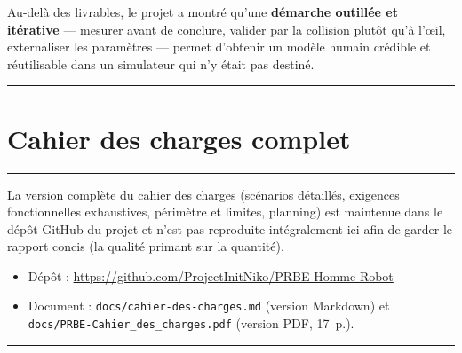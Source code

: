 \documentclass[12pt]{article}
\newcommand{\barre}{\noindent\textcolor{supmerange}{\rule{\textwidth}{3pt}}}
\newcommand{\rsection}[1]{%
  \barre\par\vspace{2pt}%
  \section{#1}%
  \vspace{-6pt}\barre\par\vspace{0.7em}}
\begin{document}
\medskip
Au-delà des livrables, le projet a montré qu'une \textbf{démarche outillée et
itérative} --- mesurer avant de conclure, valider par la collision plutôt qu'à
l'\oe il, externaliser les paramètres --- permet d'obtenir un modèle humain
crédible et réutilisable dans un simulateur qui n'y était pas destiné.

\newpage
\appendix
\rsection{Cahier des charges complet}
\label{annexe:cdc}

La version complète du cahier des charges (scénarios détaillés, exigences
fonctionnelles exhaustives, périmètre et limites, planning) est maintenue dans le
dépôt GitHub du projet et n'est pas reproduite intégralement ici afin de garder le
rapport concis (la qualité primant sur la quantité).

{\sloppy
\begin{itemize}[noitemsep]
  \item Dépôt : \url{https://github.com/ProjectInitNiko/PRBE-Homme-Robot}
  \item Document : \texttt{docs/cahier-des-charges.md} (version Markdown) et
        \texttt{docs/PRBE-Cahier\_des\_charges.pdf} (version PDF, 17~p.).
\end{itemize}\par}

\newpage
\barre\par\vspace{2pt}

\end{document}
